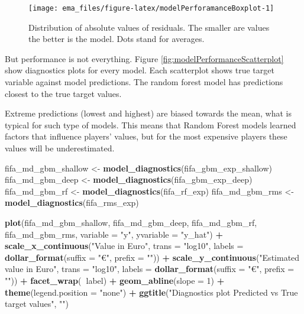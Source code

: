 \documentclass[]{krantz}
\newenvironment{Shaded}{\begin{snugshade}}{\end{snugshade}}
\newcommand{\DataTypeTok}[1]{\textcolor[rgb]{0.13,0.29,0.53}{#1}}
\newcommand{\DecValTok}[1]{\textcolor[rgb]{0.00,0.00,0.81}{#1}}
\newcommand{\KeywordTok}[1]{\textcolor[rgb]{0.13,0.29,0.53}{\textbf{#1}}}
\newcommand{\NormalTok}[1]{#1}
\newcommand{\OperatorTok}[1]{\textcolor[rgb]{0.81,0.36,0.00}{\textbf{#1}}}
\newcommand{\StringTok}[1]{\textcolor[rgb]{0.31,0.60,0.02}{#1}}
\begin{document}
\begin{figure}

{\centering \texttt{[image: ema\_files/figure-latex/modelPerforamanceBoxplot-1]} 

}

\caption{Distribution of absolute values of residuals. The smaller are values the better is the model. Dots stand for averages.}\label{fig:modelPerforamanceBoxplot}
\end{figure}

But performance is not everything. Figure \ref{fig:modelPerformanceScatterplot} show diagnostics plots for every model. Each scatterplot shows true target variable against model predictions. The random forest model has predictions closest to the true target values.

Extreme predictions (lowest and highest) are biased towards the mean, what is typical for such type of models. This means that Random Forest models learned factors that influence players' values, but for the most expensive players these values will be underestimated.

\begin{Shaded}
\begin{Highlighting}[]
\NormalTok{fifa_md_gbm_shallow <-}\StringTok{ }\KeywordTok{model_diagnostics}\NormalTok{(fifa_gbm_exp_shallow)}
\NormalTok{fifa_md_gbm_deep <-}\StringTok{ }\KeywordTok{model_diagnostics}\NormalTok{(fifa_gbm_exp_deep)}
\NormalTok{fifa_md_gbm_rf <-}\StringTok{ }\KeywordTok{model_diagnostics}\NormalTok{(fifa_rf_exp)}
\NormalTok{fifa_md_gbm_rms <-}\StringTok{ }\KeywordTok{model_diagnostics}\NormalTok{(fifa_rms_exp)}

\KeywordTok{plot}\NormalTok{(fifa_md_gbm_shallow, fifa_md_gbm_deep, }
\NormalTok{                fifa_md_gbm_rf, fifa_md_gbm_rms, }
     \DataTypeTok{variable =} \StringTok{"y"}\NormalTok{, }\DataTypeTok{yvariable =} \StringTok{"y_hat"}\NormalTok{) }\OperatorTok{+}
\StringTok{  }\KeywordTok{scale_x_continuous}\NormalTok{(}\StringTok{"Value in Euro"}\NormalTok{, }\DataTypeTok{trans =} \StringTok{"log10"}\NormalTok{, }\DataTypeTok{labels =} \KeywordTok{dollar_format}\NormalTok{(}\DataTypeTok{suffix =} \StringTok{"€"}\NormalTok{, }\DataTypeTok{prefix =} \StringTok{""}\NormalTok{)) }\OperatorTok{+}\StringTok{ }
\StringTok{  }\KeywordTok{scale_y_continuous}\NormalTok{(}\StringTok{"Estimated value in Euro"}\NormalTok{, }\DataTypeTok{trans =} \StringTok{"log10"}\NormalTok{, }\DataTypeTok{labels =} \KeywordTok{dollar_format}\NormalTok{(}\DataTypeTok{suffix =} \StringTok{"€"}\NormalTok{, }\DataTypeTok{prefix =} \StringTok{""}\NormalTok{)) }\OperatorTok{+}\StringTok{ }
\StringTok{  }\KeywordTok{facet_wrap}\NormalTok{(}\OperatorTok{~}\NormalTok{label) }\OperatorTok{+}
\StringTok{  }\KeywordTok{geom_abline}\NormalTok{(}\DataTypeTok{slope =} \DecValTok{1}\NormalTok{) }\OperatorTok{+}\StringTok{ }\KeywordTok{theme}\NormalTok{(}\DataTypeTok{legend.position =} \StringTok{"none"}\NormalTok{) }\OperatorTok{+}
\StringTok{  }\KeywordTok{ggtitle}\NormalTok{(}\StringTok{"Diagnostics plot Predicted vs True target values"}\NormalTok{, }\StringTok{""}\NormalTok{)}
\end{Highlighting}
\end{Shaded}
\end{document}

